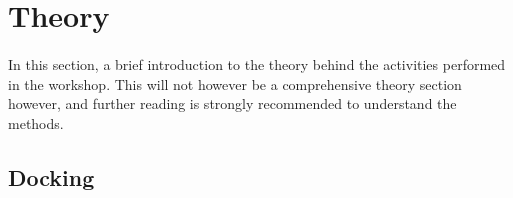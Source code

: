 \section{Theory}
    \paragraph{}
    In this section, a brief introduction to the theory behind the activities performed in the workshop. This will not however be a comprehensive theory section however, and further reading is strongly recommended to understand the methods.



\subsection{Docking}


